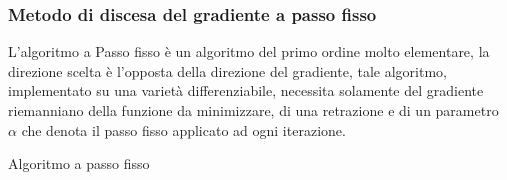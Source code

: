 \documentclass[a4paper, 12pt]{article}
\begin{document}
\subsubsection{Metodo di discesa del gradiente a passo fisso}
L'algoritmo a Passo fisso è un algoritmo del primo ordine molto elementare, la direzione scelta è l'opposta della direzione del gradiente, tale algoritmo, implementato su una varietà differenziabile, necessita solamente del gradiente riemanniano della funzione da minimizzare, di una retrazione e di un parametro $\alpha$ che denota il passo fisso applicato ad ogni iterazione.\\
\begin{center}
\begin{algorithm}[H]
\SetAlgoLined
{}
\caption{Algoritmo a passo fisso}
\end{algorithm}
\end{center}
\end{document}
